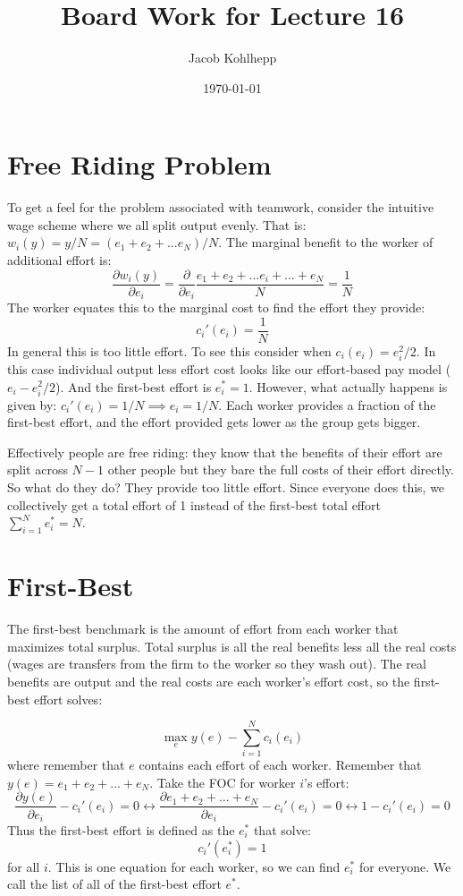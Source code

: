 \documentclass{article}
\title{Board Work for Lecture 16}
\author{Jacob Kohlhepp}
\date{\today}
\begin{document}
\maketitle


\section{Free Riding Problem}

To get a feel for the problem associated with teamwork, consider the intuitive wage scheme where we all split output evenly. That is: $w_i(y)=y/N=(e_1+e_2+...e_N)/N$. The marginal benefit to the worker of additional effort is:
\[\frac{\partial w_i(y)}{\partial e_i} = \frac{\partial }{\partial e_i} \frac{e_1+e_2+...e_i+...+e_N}{N} = \frac{1}{N} \]
The worker equates this to the marginal cost to find the effort they provide:
\[c_i'(e_i)=\frac{1}{N} \]
In general this is too little effort. To see this consider when $c_i(e_i)=e_i^2/2$. In this case individual output less effort cost looks like our effort-based pay model ($e_i-e_i^2/2$). And the first-best effort is $e_i^*=1$. However, what actually happens is given by: $c_i'(e_i)=1/N \implies e_i=1/N$. Each worker provides a fraction of the first-best effort, and the effort provided gets lower as the group gets bigger.

Effectively people are free riding: they know that the benefits of their effort are split across $N-1$ other people but they bare the full costs of their effort directly. So what do they do? They provide too little effort. Since everyone does this, we collectively get a total effort of 1 instead of the first-best total effort $\sum_{i=1}^N e^*_i = N$.

\section{First-Best}

The first-best benchmark is the amount of effort from each worker that maximizes total surplus. Total surplus is all the real benefits less all the real costs (wages are transfers from the firm to the worker so they wash out). The real benefits are output and the real costs are each worker's effort cost, so the first-best effort solves:

\[\max_{e} y(e) -\sum_{i=1}^N c_i(e_i)\]
where remember that $e$ contains each effort of each worker. Remember that $y(e)=e_1+e_2+...+e_N$. Take the FOC for worker $i$'s effort:
\[\frac{\partial y(e)}{\partial e_i} -c_i'(e_i)=0 \leftrightarrow \frac{\partial e_1+e_2+...+e_N}{\partial e_i}-c_i'(e_i)=0\leftrightarrow 1 -c_i'(e_i)=0\]
Thus the first-best effort is defined as the $e_i^*$ that solve:
\[ c_i'(e_i^*)=1\]
for all $i$. This is one equation for each worker, so we can find $e_i^*$ for everyone. We call the list of all of the first-best effort $e^*$.
\end{document}
